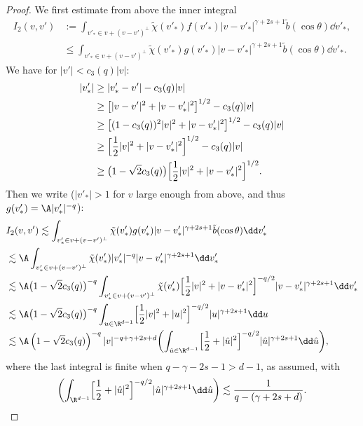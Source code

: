 \begin{proof}
We first estimate from above the inner integral
\[
\begin{aligned}
I_2(v,v') &:= \int_{v'_* \in v + (v-v')^\bot} \tilde \chi(v'_*) f(v'_*)
|v-v'_*|^{\gamma+2s +1} \tilde b(\cos \theta) \dd v'_* , \\
&\leq \int_{v'_* \in v + (v-v')^\bot} \tilde \chi(v'_*) g(v'_*)
|v-v'_*|^{\gamma+2s +1} \tilde b(\cos \theta) \dd v'_* .
\end{aligned}
\]
We have for $|v'|< c_3(q) |v|$:
\begin{align*}
|v'_*| &\ge |v'_*-v'|- c_3(q) |v| \\
& \ge \big[|v-v'|^2+|v-v'_*|^2\big]^{1/2} - c_3(q) |v| \\
& \ge \big[ (1-c_3(q))^2|v|^2 + |v-v'_*|^2\big]^{1/2} - c_3(q) |v|\\
& \ge \Bigl[ \frac12 |v|^2 + |v-v'_*|^2\Bigr]^{1/2} - c_3(q) |v|\\
& \ge \bigl(1-\sqrt 2c_3(q)\bigr) \Bigl[ \frac12|v|^2 + |v-v'_*|^2 \Bigr]^{1/2}.
\end{align*}
Then we write ($|v'_*| >1$ for $v$ large enough from above, and thus
$g(v'_*) = \A |v'_*|^{-q}$):
\begin{align*}
&I_2(v,v') \lesssim \int_{v'_* \in v + (v-v')^\bot} \tilde \chi(v'_*) g(v'_*)
|v-v'_*|^{\gamma+2s +1} \tilde b(\cos \theta) \dd v'_* \\
&\lesssim \A \int_{v'_* \in v + (v-v')^\bot} \tilde \chi(v'_*) |v'_*|^{-q}
|v-v'_*|^{\gamma+2s +1} \dd v'_* \\
&\lesssim \A \bigl(1-\sqrt{2} c_3(q) \bigr)^{-q} \int_{v'_* \in v + (v-v')^\bot} \tilde \chi(v'_*)
\Bigl[ \frac12 |v|^2 + |v-v'_*|^2\Bigr]^{-q/2}
|v-v'_*|^{\gamma+2s +1} \dd v'_* \\
&\lesssim \A \bigl(1-\sqrt{2} c_3(q) \bigr)^{-q} \int_{u \in
\R^{d-1}}
\Bigl[ \frac12 |v|^2 + |u|^2\Bigl]^{-q/2} |u|^{\gamma+2s +1} \dd u \\
&\lesssim \A \left(1-\sqrt 2 c_3(q)\right)^{-q} |v|^{-q+\gamma+2s +d}
\biggl( \int_{\hat u \in
\R^{d-1}}
\Bigl[ \frac12 + |\hat u|^2\Bigr]^{-q/2} |\hat u|^{\gamma+2s +1}
\dd \hat u \biggr),
\end{align*}
where the last integral is finite when $q -\gamma-2s -1 > d-1$, as
assumed, with
\begin{equation*}
\biggl( \int_{\R^{d-1}} \Bigl[ \frac12 + |\hat u|^2\Bigr]^{-q/2} |\hat u|^{\gamma+2s +1}
\dd \hat u \biggr) \lesssim \frac{1}{q - (\gamma+2s+d)}.
\end{equation*}


\end{proof}
